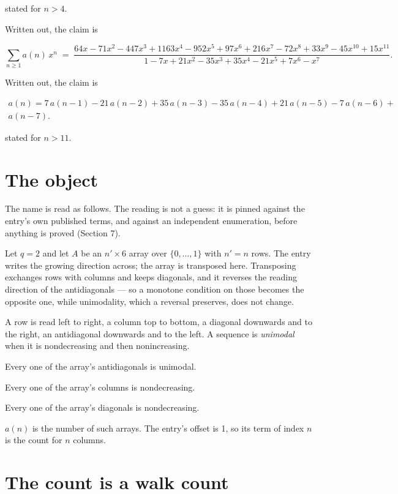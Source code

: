 \documentclass[11pt]{article}
\theoremstyle{definition}
\begin{document}
stated for $n > 4$.

Written out, the claim is

\[\sum_{n \ge 1} a(n)\,x^n \;=\; \frac{64x - 71x^{2} - 447x^{3} + 1163x^{4} - 952x^{5} + 97x^{6} + 216x^{7} - 72x^{8} + 33x^{9} - 45x^{10} + 15x^{11}}{1 - 7x + 21x^{2} - 35x^{3} + 35x^{4} - 21x^{5} + 7x^{6} - x^{7}}.\]

Written out, the claim is

\begin{multline*} a(n) = 7\,a(n-1) - 21\,a(n-2) + 35\,a(n-3) - 35\,a(n-4) + 21\,a(n-5) - 7\,a(n-6) + \\ a(n-7). \end{multline*}

stated for $n > 11$.

\section{The object}

The name is read as follows. The reading is not a guess: it is pinned against the entry's own published terms, and against an independent enumeration, before anything is proved (Section 7).

Let $q = 2$ and let $A$ be an $n' \times 6$ array over $\{0,\dots,1\}$ with $n' = n$ rows. The entry writes the growing direction across; the array is transposed here. Transposing exchanges rows with columns and keeps diagonals, and it reverses the reading direction of the antidiagonals --- so a monotone condition on those becomes the opposite one, while unimodality, which a reversal preserves, does not change.

A row is read left to right, a column top to bottom, a diagonal downwards and to the right, an antidiagonal downwards and to the left. A sequence is {\itshape unimodal} when it is nondecreasing and then nonincreasing.

Every one of the array's antidiagonals is unimodal.

Every one of the array's columns is nondecreasing.

Every one of the array's diagonals is nondecreasing.

$a(n)$ is the number of such arrays. The entry's offset is 1, so its term of index $n$ is the count for $n$ columns.

\section{The count is a walk count}
\end{document}
